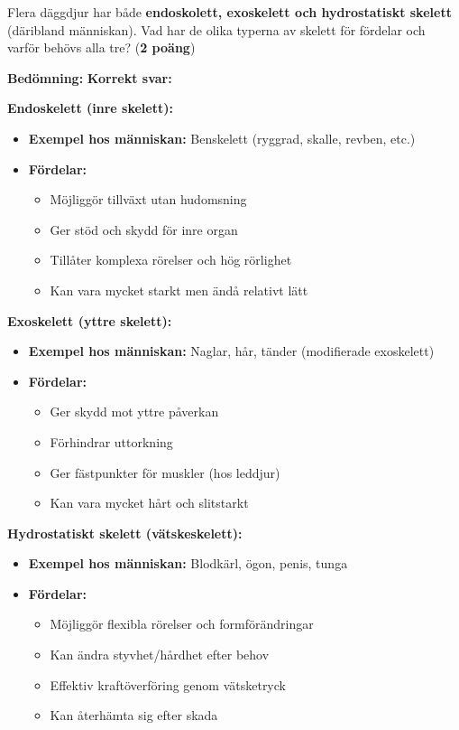 \documentclass{exam}
\newenvironment{answer}
  {\begin{framed}\color{blue}\textbf{Bedömning:} }
  {\end{framed}}
\begin{document}
\begin{questions}
\break

\question Flera däggdjur har både \textbf{endoskolett, exoskelett och hydrostatiskt skelett} (däribland människan). Vad har de olika typerna av skelett för fördelar och varför behövs alla tre? (\textbf{2 poäng})

\vspace{10mm}

\begin{answer}
\textbf{Korrekt svar:}

\textbf{Endoskelett (inre skelett):}
\begin{itemize}
  \item \textbf{Exempel hos människan:} Benskelett (ryggrad, skalle, revben, etc.)
  \item \textbf{Fördelar:}
  \begin{itemize}
    \item Möjliggör tillväxt utan hudomsning
    \item Ger stöd och skydd för inre organ
    \item Tillåter komplexa rörelser och hög rörlighet
    \item Kan vara mycket starkt men ändå relativt lätt
  \end{itemize}
\end{itemize}

\textbf{Exoskelett (yttre skelett):}
\begin{itemize}
  \item \textbf{Exempel hos människan:} Naglar, hår, tänder (modifierade exoskelett)
  \item \textbf{Fördelar:}
  \begin{itemize}
    \item Ger skydd mot yttre påverkan
    \item Förhindrar uttorkning
    \item Ger fästpunkter för muskler (hos leddjur)
    \item Kan vara mycket hårt och slitstarkt
  \end{itemize}
\end{itemize}

\textbf{Hydrostatiskt skelett (vätskeskelett):}
\begin{itemize}
  \item \textbf{Exempel hos människan:} Blodkärl, ögon, penis, tunga
  \item \textbf{Fördelar:}
  \begin{itemize}
    \item Möjliggör flexibla rörelser och formförändringar
    \item Kan ändra styvhet/hårdhet efter behov
    \item Effektiv kraftöverföring genom vätsketryck
    \item Kan återhämta sig efter skada
  \end{itemize}
\end{itemize}


\end{answer}
\end{questions}
\end{document}
